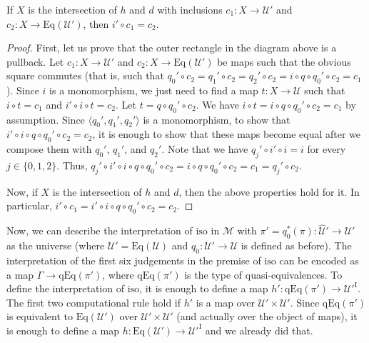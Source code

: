 \documentclass{amsart}
\theoremstyle{definition}
\theoremstyle{remark}
\newcommand{\fs}[1]{\mathrm{#1}}
\newcommand{\I}{\fs{I}}
\newcommand{\iso}{\fs{iso}}
\newcommand{\U}{\mathcal{U}}
\newcommand{\hU}{\widehat{\mathcal{U}}}
\newcommand{\Eq}{\fs{Eq}}
\newcommand{\qEq}{\fs{qEq}}
\numberwithin{figure}{section}
\begin{document}
\begin{lem}[intersection]
If $X$ is the intersection of $h$ and $d$ with inclusions $c_1 : X \to \U'$ and $c_2 : X \to \Eq(\U')$, then $i' \circ c_1 = c_2$.
\end{lem}
\begin{proof}
First, let us prove that the outer rectangle in the diagram above is a pullback.
Let $c_1 : X \to \U'$ and $c_2 : X \to \Eq(\U')$ be maps such that the obvious square commutes (that is, such that $q_0' \circ c_2 = q_1' \circ c_2 = q_2' \circ c_2 = i \circ q \circ q_0' \circ c_2 = c_1$).
Since $i$ is a monomorphism, we just need to find a map $t : X \to \U$ such that $i \circ t = c_1$ and $i' \circ i \circ t = c_2$.
Let $t = q \circ q_0' \circ c_2$.
We have $i \circ t = i \circ q \circ q_0' \circ c_2 = c_1$ by assumption.
Since $\langle q_0', q_1', q_2' \rangle$ is a monomorphism, to show that $i' \circ i \circ q \circ q_0' \circ c_2 = c_2$, it is enough to show that these maps become equal after we compose them with $q_0'$, $q_1'$, and $q_2'$.
Note that we have $q_j' \circ i' \circ i = i$ for every $j \in \{ 0, 1, 2 \}$.
Thus, $q_j' \circ i' \circ i \circ q \circ q_0' \circ c_2 = i \circ q \circ q_0' \circ c_2 = c_1 = q_j' \circ c_2$.

Now, if $X$ is the intersection of $h$ and $d$, then the above properties hold for it.
In particular, $i' \circ c_1 = i' \circ i \circ q \circ q_0' \circ c_2 = c_2$.
\end{proof}

Now, we can describe the interpretation of $\iso$ in $\mathcal{M}$ with $\pi' = q_0^*(\pi) : \hU' \to \U'$ as the universe (where $\U' = \Eq(\U)$ and $q_0 : \U' \to \U$ is defined as before).
The interpretation of the first six judgements in the premise of $\iso$ can be encoded as a map $\Gamma \to \qEq(\pi')$, where $\qEq(\pi')$ is the type of quasi-equivalences.
To define the interpretation of $\iso$, it is enough to define a map $h' : \qEq(\pi') \to \U'^\I$.
The first two computational rule hold if $h'$ is a map over $\U' \times \U'$.
Since $\qEq(\pi')$ is equivalent to $\Eq(\U')$ over $\U' \times \U'$ (and actually over the object of maps), it is enough to define a map $h : \Eq(\U') \to \U'^\I$ and we already did that.
\end{document}
